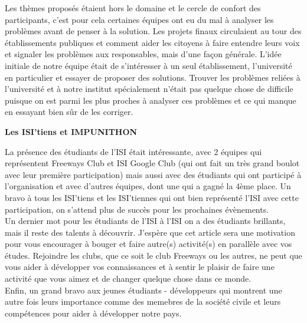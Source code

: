 \begin{multicols}{2}
Les th\`emes propos\'es \'etaient hors le domaine et le cercle de confort des participants, c'est pour cela certaines \'equipes ont eu du mal \`a analyser les probl\`emes avant de penser \`a la solution. Les projets finaux circulaient au tour des \'etablissements publiques et comment aider les citoyens \`a faire entendre leurs voix et signaler les probl\`emes aux responsables, mais d'une fa\c con g\'en\'erale. L'id\'ee initiale de notre \'equipe \'etait de s'int\'eresser \`a un seul \'etablissement, l'universit\'e en particulier et essayer de proposer des solutions. Trouver les probl\`emes reli\'ees \`a l'universit\'e et \`a notre institut sp\'ecialement n'\'etait pas quelque chose de difficile puisque on est parmi les plus proches \`a analyser ces probl\`emes et ce qui manque  en essayant bien sûr de les corriger.\\

\begin{center}
\textbf{Les ISI'tiens et IMPUNITHON }\\
\end{center}

La pr\'esence des \'etudiants de l'ISI \'etait int\'eressante, avec 2 \'equipes qui repr\'esentent Freeways Club et ISI Google Club (qui ont fait un tr\`es grand boulot avec leur premi\`ere participation) mais aussi avec des \'etudiants qui ont particip\'e \`a l'organisation et avec d'autres \'equipes, dont une qui a gagn\'e la 4\`eme place. Un bravo \`a tous les ISI'tiens et les ISI'tiennes qui ont bien repr\'esent\'e l'ISI avec cette participation, on s'attend plus de succ\`es pour les prochaines \'ev\`enements.\\

Un dernier mot pour les \'etudiants de l'ISI
\`a l'ISI on a des \'etudiants brillants, mais il reste des talents \`a d\'ecouvrir. J'esp\`ere que cet article sera une motivation pour vous encourager \`a bouger et faire autre(s) activit\'e(s) en parall\`ele avec vos \'etudes. Rejoindre les clubs, que ce soit le club Freeways ou les autres, ne peut que vous aider \`a d\'evelopper vos connaissances et \`a sentir le plaisir de faire une activit\'e que vous aimez et de changer quelque chose dans ce monde.\\

Enfin, un grand bravo aux jeunes \'etudiants - d\'eveloppeurs qui montrent une autre fois leurs importance comme des memebres de la soci\'et\'e civile et leurs comp\'etences pour aider \`a d\'evelopper notre pays.


\end{multicols}


